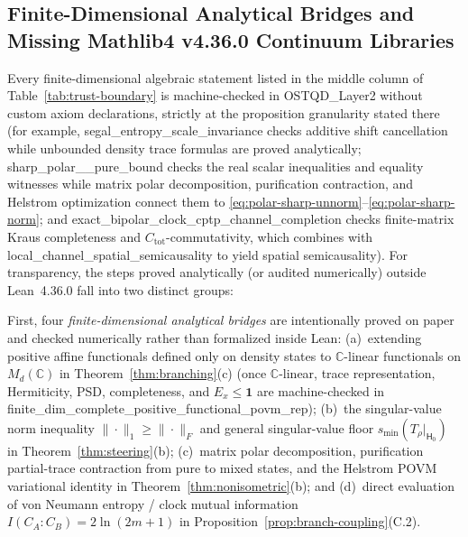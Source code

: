 \documentclass[11pt,a4paper]{article}
\theoremstyle{definition}
\theoremstyle{remark}
\newcommand{\bbC}{\mathbb{C}}
\newcommand{\1}{\mathbf{1}}
\newcommand{\code}[1]{{\scriptsize\ttfamily #1}}
\begin{document}
\subsection{Finite-Dimensional Analytical Bridges and Missing Mathlib4 v4.36.0 Continuum Libraries}\label{sec:mathlib-gaps}

Every finite-dimensional algebraic statement listed in the middle column of Table~\ref{tab:trust-boundary} is machine-checked in \code{OSTQD\_Layer2} without custom \code{axiom} declarations, strictly at the proposition granularity stated there (for example, \code{segal\_\allowbreak entropy\_\allowbreak scale\_\allowbreak invariance} checks additive shift cancellation while unbounded density trace formulas are proved analytically; \code{sharp\_\allowbreak polar\_\allowbreak *\_\allowbreak pure\_\allowbreak bound} checks the real scalar inequalities and equality witnesses while matrix polar decomposition, purification contraction, and Helstrom optimization connect them to \eqref{eq:polar-sharp-unnorm}--\eqref{eq:polar-sharp-norm}; and \code{exact\_\allowbreak bipolar\_\allowbreak clock\_\allowbreak cptp\_\allowbreak channel\_\allowbreak completion} checks finite-matrix Kraus completeness and $C_{\mathrm{tot}}$-commutativity, which combines with \code{local\_\allowbreak channel\_\allowbreak spatial\_\allowbreak semicausality} to yield spatial semicausality). For transparency, the steps proved analytically (or audited numerically) outside Lean~4.36.0 fall into two distinct groups:

First, four \emph{finite-dimensional analytical bridges} are intentionally proved on paper and checked numerically rather than formalized inside Lean: (a)~extending positive affine functionals defined only on density states to $\bbC$-linear functionals on $M_d(\bbC)$ in Theorem~\ref{thm:branching}(c) (once $\bbC$-linear, trace representation, Hermiticity, PSD, completeness, and $E_x\le\1$ are machine-checked in \code{finite\_dim\_complete\_positive\_functional\_povm\_rep}); (b)~the singular-value norm inequality $\|\cdot\|_1\ge\|\cdot\|_F$ and general singular-value floor $s_{\min}(T_\rho|_{\mathsf{H}_0})$ in Theorem~\ref{thm:steering}(b); (c)~matrix polar decomposition, purification partial-trace contraction from pure to mixed states, and the Helstrom POVM variational identity in Theorem~\ref{thm:nonisometric}(b); and (d)~direct evaluation of von Neumann entropy / clock mutual information $I(C_A:C_B)=2\ln(2m+1)$ in Proposition~\ref{prop:branch-coupling}(C.2).
\end{document}
